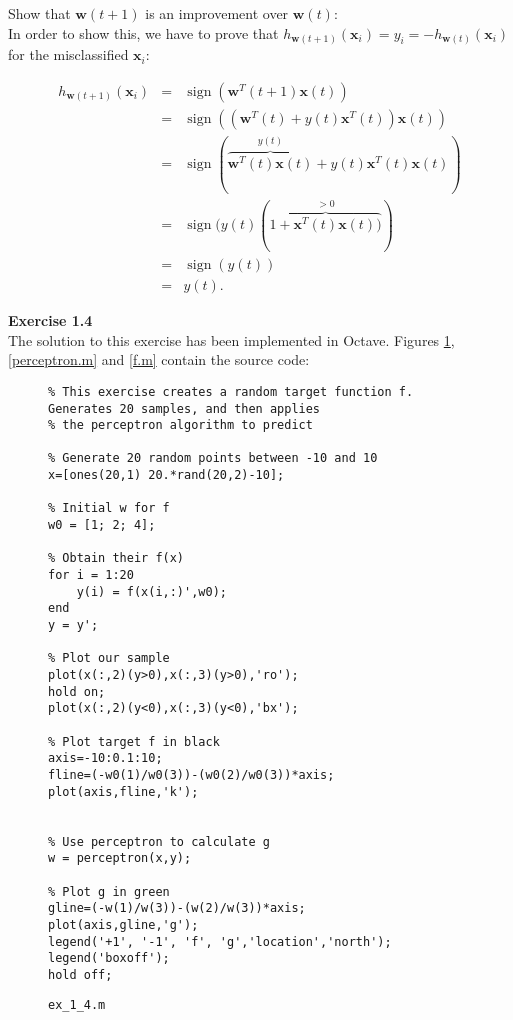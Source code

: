 \documentclass[11pt]{article}
\begin{document}
Show that $\mathbf{w}(t+1)$ is an improvement over $\mathbf{w}(t)$:\\

In order to show this, we have to prove that $h_{\mathbf{w}(t+1)}(\mathbf{x}_i)=y_i=-h_{\mathbf{w}(t)}(\mathbf{x}_i)$ for the misclassified $\mathbf{x}_i$:

\begin{eqnarray*}
h_{\mathbf{w}(t+1)}(\mathbf{x}_i)&=&\operatorname{sign}(\mathbf{w}^T(t+1)\mathbf{x}(t))\\
&=&\operatorname{sign}((\mathbf{w}^T(t)+y(t)\mathbf{x}^T(t))\mathbf{x}(t))\\
&=&\operatorname{sign}(\overbrace{\mathbf{w}^T(t)\mathbf{x}(t)}^{y(t)}+y(t)\mathbf{x}^T(t)\mathbf{x}(t))\\
&=&\operatorname{sign}(y(t)(\overbrace{1+\mathbf{x}^T(t)\mathbf{x}(t))}^{>0})\\
&=&\operatorname{sign}(y(t))\\
&=&y(t).
\end{eqnarray*}

\textbf{Exercise 1.4}\\

The solution to this exercise has been implemented in Octave. Figures \ref{ex_1_4.m}, \ref{perceptron.m} and \ref{f.m} contain the source code:

\begin{figure}[h]
\captionsetup{justification=raggedright,
singlelinecheck=false
}
\caption{\texttt{ex\_1\_4.m}}
\begin{lstlisting}
% This exercise creates a random target function f. Generates 20 samples, and then applies
% the perceptron algorithm to predict

% Generate 20 random points between -10 and 10
x=[ones(20,1) 20.*rand(20,2)-10];

% Initial w for f
w0 = [1; 2; 4];

% Obtain their f(x)
for i = 1:20
    y(i) = f(x(i,:)',w0);
end
y = y';

% Plot our sample
plot(x(:,2)(y>0),x(:,3)(y>0),'ro');
hold on;
plot(x(:,2)(y<0),x(:,3)(y<0),'bx');

% Plot target f in black
axis=-10:0.1:10;
fline=(-w0(1)/w0(3))-(w0(2)/w0(3))*axis;
plot(axis,fline,'k');


% Use perceptron to calculate g
w = perceptron(x,y);

% Plot g in green
gline=(-w(1)/w(3))-(w(2)/w(3))*axis;
plot(axis,gline,'g');
legend('+1', '-1', 'f', 'g','location','north');
legend('boxoff');
hold off;
\end{lstlisting}
\label{ex_1_4.m}
\end{figure}
\end{document}
